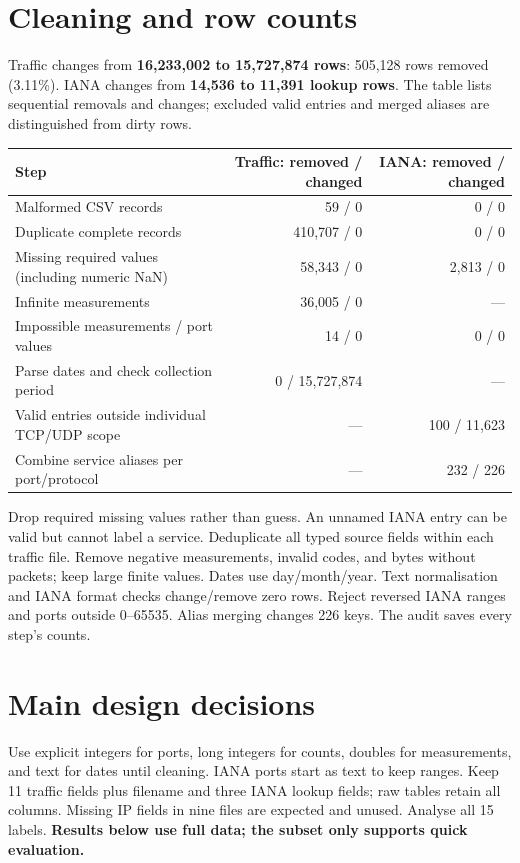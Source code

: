 \documentclass[10pt,a4paper]{article}
\begin{document}
\section{Cleaning and row counts}
Traffic changes from \textbf{16,233,002 to 15,727,874 rows}: 505,128 rows removed (3.11\%). IANA changes from \textbf{14,536 to 11,391 lookup rows}. The table lists sequential removals and changes; excluded valid entries and merged aliases are distinguished from dirty rows.
\begin{center}\small
\begin{tabular}{@{}lrr@{}}
\toprule
Step & Traffic: removed / changed & IANA: removed / changed \\
\midrule
Malformed CSV records & 59 / 0 & 0 / 0 \\
Duplicate complete records & 410,707 / 0 & 0 / 0 \\
Missing required values (including numeric NaN) & 58,343 / 0 & 2,813 / 0 \\
Infinite measurements & 36,005 / 0 & --- \\
Impossible measurements / port values & 14 / 0 & 0 / 0 \\
Parse dates and check collection period & 0 / 15,727,874 & --- \\
Valid entries outside individual TCP/UDP scope & --- & 100 / 11,623 \\
Combine service aliases per port/protocol & --- & 232 / 226 \\
\bottomrule
\end{tabular}
\end{center}
Drop required missing values rather than guess. An unnamed IANA entry can be valid but cannot label a service. Deduplicate all typed source fields within each traffic file. Remove negative measurements, invalid codes, and bytes without packets; keep large finite values. Dates use day/month/year. Text normalisation and IANA format checks change/remove zero rows. Reject reversed IANA ranges and ports outside 0--65535. Alias merging changes 226 keys. The audit saves every step's counts.

\section{Main design decisions}
Use explicit integers for ports, long integers for counts, doubles for measurements, and text for dates until cleaning. IANA ports start as text to keep ranges. Keep 11 traffic fields plus filename and three IANA lookup fields; raw tables retain all columns. Missing IP fields in nine files are expected and unused. Analyse all 15 labels. \textbf{Results below use full data; the subset only supports quick evaluation.}
\end{document}
